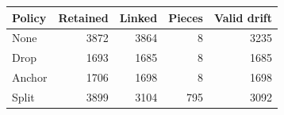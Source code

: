 \begin{tabular}{lrrrr}
\toprule
Policy & Retained & Linked & Pieces & Valid drift \\
\midrule
None & 3872 & 3864 & 8 & 3235 \\
Drop & 1693 & 1685 & 8 & 1685 \\
Anchor & 1706 & 1698 & 8 & 1698 \\
Split & 3899 & 3104 & 795 & 3092 \\
\bottomrule
\end{tabular}
